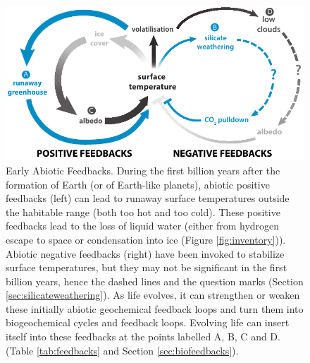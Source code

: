 \begin{figure}[!tbp]
	\centering
	\includegraphics[width=0.9\linewidth]{figures/Feedback.pdf}
	\caption[Early abiotic feedbacks on Earth-like planets]{Early Abiotic Feedbacks.
		During the first billion years after the formation of Earth (or of Earth-like planets), abiotic positive feedbacks (left) can lead to runaway surface temperatures outside the habitable range (both too hot and too cold). These positive feedbacks lead to the loss of liquid water (either from hydrogen escape to space or condensation into ice (Figure \ref{fig:inventory})). Abiotic negative feedbacks (right) have been invoked to stabilize surface temperatures, but they may not be significant in the first billion years, hence the dashed lines
		and the question marks (Section \ref{sec:silicateweathering}).
		As life evolves, it can strengthen or weaken these initially abiotic geochemical feedback loops and turn them into biogeochemical cycles and feedback loops. Evolving life can insert itself into these feedbacks at the points labelled A, B, C and D. (Table \ref{tab:feedbacks} and Section \ref{sec:biofeedbacks}).
	}
	\label{fig:feedbacks}
\end{figure}

